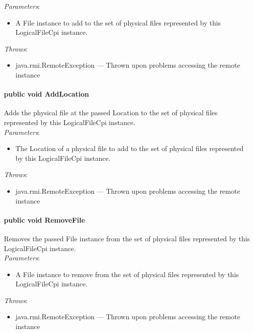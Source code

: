 \documentclass[$Date: 2003/06/26 19:29:31 $]{glabarticle}
\begin{document}
\textit{Parameters}:
\begin{itemize}
\item[] A File instance to add to the set of physical files represented by this LogicalFileCpi instance.
\end{itemize}

 \textit{Throws}:
 \begin{itemize}
 \item[] java.rmi.RemoteException --- Thrown upon problems accessing the remote instance 
 \end{itemize}

\paragraph{public void AddLocation}

Adds the physical file at the passed Location to the set of physical
files represented by this LogicalFileCpi instance.\\

\textit{Parameters}:
\begin{itemize}
\item[] The Location of a physical file to add to the set of physical files represented by this LogicalFileCpi
 instance.
\end{itemize}

 \textit{Throws}:
 \begin{itemize}
 \item[] java.rmi.RemoteException --- Thrown upon problems accessing the remote instance 
 \end{itemize}

\paragraph{public void RemoveFile}

Removes the passed File instance from the set of physical files
represented by this LogicalFileCpi instance.\\

\textit{Parameters}:
\begin{itemize}
\item[] A File instance to remove from the set of physical files represented by this LogicalFileCpi instance.
\end{itemize}

 \textit{Throws}:
 \begin{itemize}
 \item[] java.rmi.RemoteException --- Thrown upon problems accessing the remote instance 
 \end{itemize}
\end{document}
